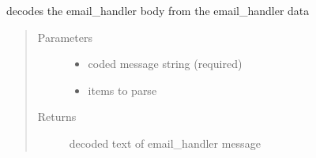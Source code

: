 \documentclass[letterpaper,10pt,english]{sphinxmanual}
\begin{document}
\begin{fulllineitems}
\label{\detokenize{index:ListManagement.utility.email_helper.get_msg_part}}
decodes the email\_handler body from the email\_handler data
\begin{quote}\begin{description}
\item[{Parameters}] \leavevmode\begin{itemize}
\item {} 
 \textendash{} coded message string (required)

\item {} 
 \textendash{} items to parse

\end{itemize}

\item[{Returns}] \leavevmode
decoded text of email\_handler message

\end{description}\end{quote}

\end{fulllineitems}


\begin{fulllineitems}
\label{\detokenize{index:ListManagement.utility.email_helper.handle_list_queue_requests}}
\end{fulllineitems}

\end{document}
